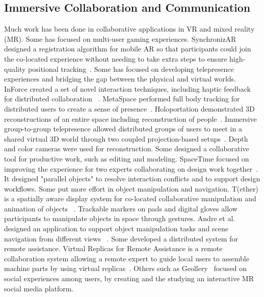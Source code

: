 \documentclass{sigchi}
\begin{document}
\subsection{Immersive Collaboration and Communication}
Much work has been done in collaborative applications in VR and mixed reality (MR). Some has focused on multi-user gaming experiences. SynchronizAR designed a registration algorithm for mobile AR so that participants could join the co-located experience without needing to take extra steps to ensure high-quality positional tracking~\cite{huo2018synchronizar}.
Some has focused on developing telepresence experiences and bridging the gap between the physical and virtual worlds. InForce created a set of novel interaction techniques, including haptic feedback for distributed collaboration ~\cite{nakagaki2019inforce}.
MetaSpace performed full body tracking for distributed users to create a sense of presence~\cite{sra2015metaspace}.
Holoportation demonstrated 3D reconstructions of an entire space including reconstruction of people~\cite{orts2016holoportation}.
Immersive group-to-group telepresence allowed distributed groups of users to meet in a shared virtual 3D world through two coupled projection-based setups~\cite{beck2013immersive}. Depth and color cameras were used for reconstruction. Some designed a collaborative tool for productive work, such as editing and modeling. SpaceTime focused on improving the experience for two experts collaborating on design work together~\cite{xia2018spacetime}. It designed "parallel objects" to resolve interaction conflicts and to support design workflows. Some put more effort in object manipulation and navigation. T(ether) is a spatially aware display system for co-located collaborative manipulation and animation of objects ~\cite{lakatos2014t}. Trackable markers on pads and digital gloves allow participants to manipulate objects in space through gestures. Andre et al. designed an application to support object manipulation tasks and scene navigation from different views ~\cite{kunert2019multi}. Some developed a distributed system for remote assistance. Virtual Replicas for Remote Assistance is a remote collaboration system allowing a remote expert to guide local users to assemble machine parts by using virtual replicas~\cite{oda2015virtual}. Others such as Geollery~\cite{du2019geollery, du2016social} focused on social experiences among users, by creating and the studying an interactive MR social media platform.
\end{document}
